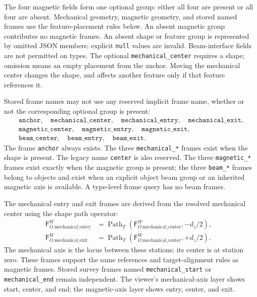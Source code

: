 \documentclass[11pt,a4paper]{article}
\newcommand{\Frame}{\mathsf{F}}
\newcommand{\Path}{\operatorname{Path}}
\begin{document}
The four magnetic fields form one optional group: either all four are present
or all four are absent. Mechanical geometry, magnetic geometry, and stored
named frames use the feature-placement rules below. An absent magnetic group
contributes no magnetic frames. An absent shape or feature group is represented
by omitted JSON members; explicit \texttt{null} values are invalid.
Beam-interface fields are not permitted on types. The optional
\texttt{mechanical\_center} requires a shape; omission means an empty
placement from the anchor. Moving the mechanical center changes the shape,
and affects another feature only if that feature references it.

Stored frame names may not use any reserved implicit frame name, whether or
not the corresponding optional group is present:
\begin{equation}
  \begin{aligned}
  &\texttt{anchor},\quad\texttt{mechanical\_center},\quad
   \texttt{mechanical\_entry},\quad\texttt{mechanical\_exit},\\
  &\texttt{magnetic\_center},\quad
   \texttt{magnetic\_entry},\quad
   \texttt{magnetic\_exit},\\
  &\texttt{beam\_center},\quad
   \texttt{beam\_entry},\quad
   \texttt{beam\_exit}.
  \end{aligned}
\end{equation}
The frame \texttt{anchor} always exists. The three \texttt{mechanical\_*}
frames exist when the shape is present. The legacy
name \texttt{center} is also reserved. The three \texttt{magnetic\_*}
frames exist exactly when the magnetic group is present; the three
\texttt{beam\_*} frames belong to objects and exist when an explicit object
beam group or an inherited magnetic axis is available. A type-level frame
query has no beam frames.

The mechanical entry and exit frames are derived from the resolved mechanical
center using the shape path operator:
\begin{align}
  \Frame_{O.\mathrm{mechanical\_entry}}^W
    &=\Path_T(\Frame_{O.\mathrm{mechanical\_center}}^W,-d_z/2),\\
  \Frame_{O.\mathrm{mechanical\_exit}}^W
    &=\Path_T(\Frame_{O.\mathrm{mechanical\_center}}^W,+d_z/2).
\end{align}
The mechanical axis is the locus between these stations; its center is at
station zero. These frames support the same references and target-alignment
rules as magnetic frames. Stored survey frames named
\texttt{mechanical\_start} or \texttt{mechanical\_end} remain independent.
The viewer's mechanical-axis layer shows start, center, and end; the
magnetic-axis layer shows entry, center, and exit.
\end{document}

